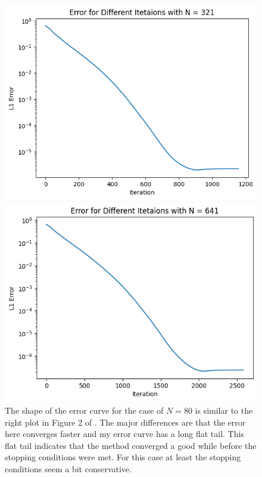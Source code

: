 \documentclass{article}
\begin{document}
\begin{figure}[H]
    \begin{minipage}{.4\linewidth}
        \centering
        \includegraphics[width=\linewidth]{imgs/L1_321.png}
    \end{minipage}%
    \begin{minipage}{.4\linewidth}
        \centering
        \includegraphics[width=\linewidth]{imgs/L1_641.png}
    \end{minipage}
    \caption{The shape of the error curve for the case of $N=80$ is similar to the right plot in Figure 2 of \cite{CHEN2013452}. The major differences are that the error here converges faster and my error curve has a long flat tail. This flat tail indicates that the method converged a good while before the stopping conditions were met. For this case at least the stopping conditions seem a bit conservative.}
    \label{fig:L1}
\end{figure}
\end{document}
